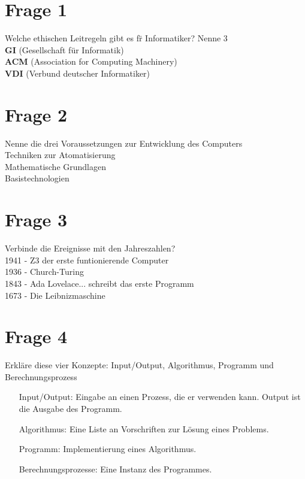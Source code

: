 \documentclass{scrartcl}[10pt]
\begin{document}
\section*{Frage 1}
Welche ethischen Leitregeln gibt es f\"r Informatiker? Nenne 3\\
\textbf{GI} (Gesellschaft für Informatik)\\
\textbf{ACM} (Association for Computing Machinery)\\
\textbf{VDI} (Verbund deutscher Informatiker)

\section*{Frage 2}
Nenne die drei Voraussetzungen zur Entwicklung des Computers\\
Techniken zur Atomatisierung\\
Mathematische Grundlagen\\
Basistechnologien\\

\section*{Frage 3}
Verbinde die Ereignisse mit den Jahreszahlen?\\
1941 - Z3 der erste funtionierende Computer\\
1936 - Church-Turing\\
1843 - Ada Lovelace... schreibt das erste Programm\\
1673 - Die Leibnizmaschine\\

\section*{Frage 4}
Erkl\"are diese vier Konzepte: Input/Output, Algorithmus, Programm und Berechnungsprozess
\begin{itemize}

\item[Input/Output:] Eingabe an einen Prozess, die er verwenden kann. Output ist die Ausgabe des Programm.

\item[Algorithmus:] Eine Liste an Vorschriften zur L\"osung eines Problems.

\item[Programm:] Implementierung eines Algorithmus.

\item[Berechnungsprozesse:] Eine Instanz des Programmes.

\end{itemize}
\end{document}
